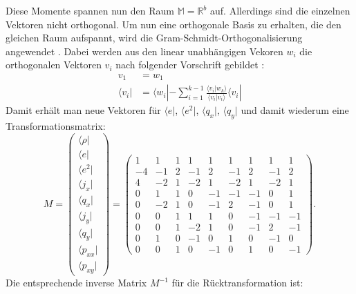 \documentclass[a4paper,10pt]{scrreprt}
\begin{document}
Diese Momente spannen nun den Raum $ \mathbb{M} = \mathbb{R}^b $ auf. Allerdings sind die einzelnen Vektoren nicht orthogonal. Um nun eine orthogonale Basis zu erhalten, die den gleichen Raum aufspannt, wird die Gram-Schmidt-Orthogonalisierung angewendet \cite{Lallemand2003}.
Dabei werden aus den linear unabhängigen Vekoren $w_i$ die orthogonalen Vektoren $v_i$ nach folgender Vorschrift gebildet \cite{Bronstein2006}:
\begin{align}
 v_1 &= w_1 \\
 \langle v_i | &= \langle w_i | - \sum_{i=1}^{k-1} \frac{\langle v_i | w_k \rangle}{\langle v_i | v_i \rangle}  \langle v_i |   
\end{align}
Damit erhält man neue Vektoren für $\langle e|$, $\langle e^2|$, $\langle q_x|$, $\langle q_y|$ und damit wiederum eine Transformationsmatrix:
\begin{equation}
 M = \left(\begin{matrix} 
            \langle \rho |   \\
	    \langle e|       \\
	    \langle e^2|     \\
	    \langle j_x|     \\
            \langle q_x |    \\
            \langle j_y|     \\
            \langle q_y |    \\
	    \langle p_{xx} | \\
	    \langle p_{xy} |
           \end{matrix}
  \right) =  \left( \begin{matrix}
       1 &  1 & 1 &  1 &  1 &  1 &  1 &  1 &  1 \\
      -4 & -1 & 2 & -1 &  2 & -1 &  2 & -1 &  2 \\
       4 & -2 & 1 & -2 &  1 & -2 &  1 & -2 &  1 \\
       0 &  1 & 1 &  0 & -1 & -1 & -1 &  0 &  1 \\
       0 & -2 & 1 &  0 & -1 &  2 & -1 &  0 &  1 \\
       0 &  0 & 1 &  1 &  1 &  0 & -1 & -1 & -1 \\
       0 &  0 & 1 & -2 &  1 &  0 & -1 &  2 & -1 \\
       0 &  1 & 0 & -1 &  0 &  1 &  0 & -1 &  0 \\
       0 &  0 & 1 &  0 & -1 &  0 &  1 &  0 & -1
\end{matrix} \right).
\end{equation}
Die entsprechende inverse Matrix $M^{-1}$ für die Rücktransformation ist:
\end{document}

